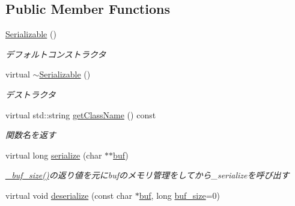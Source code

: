 \subsection*{Public Member Functions}
\begin{DoxyCompactItemize}
\item 
\hypertarget{classskl_1_1_serializable_a94b5cf22d52d2bb6a0fb58e417fa504e}{}\label{classskl_1_1_serializable_a94b5cf22d52d2bb6a0fb58e417fa504e} 
\hyperlink{classskl_1_1_serializable_a94b5cf22d52d2bb6a0fb58e417fa504e}{Serializable} ()
\begin{DoxyCompactList}\small\item\em デフォルトコンストラクタ \end{DoxyCompactList}\item 
\hypertarget{classskl_1_1_serializable_afe0b4a8ee83b34ae2e2b9cd126c662a4}{}\label{classskl_1_1_serializable_afe0b4a8ee83b34ae2e2b9cd126c662a4} 
virtual \hyperlink{classskl_1_1_serializable_afe0b4a8ee83b34ae2e2b9cd126c662a4}{$\sim$\+Serializable} ()
\begin{DoxyCompactList}\small\item\em デストラクタ \end{DoxyCompactList}\item 
\hypertarget{classskl_1_1_serializable_abcf129d50dc5b2f51300645a07ea3a38}{}\label{classskl_1_1_serializable_abcf129d50dc5b2f51300645a07ea3a38} 
virtual std\+::string \hyperlink{classskl_1_1_serializable_abcf129d50dc5b2f51300645a07ea3a38}{get\+Class\+Name} () const
\begin{DoxyCompactList}\small\item\em 関数名を返す \end{DoxyCompactList}\item 
virtual long \hyperlink{classskl_1_1_serializable_a4bd0c82fdb8a663215b54671df1222f2}{serialize} (char $\ast$$\ast$\hyperlink{classskl_1_1_serializable_a1d203d9f0049ce37183a0dcefbc6399a}{buf})
\begin{DoxyCompactList}\small\item\em \hyperlink{classskl_1_1_serializable_a489e26e25bacf78d0dae50f0286c62b5}{\+\_\+buf\+\_\+size()}の返り値を元にbufのメモリ管理をしてから\+\_\+serializeを呼び出す \end{DoxyCompactList}\item 
virtual void \hyperlink{classskl_1_1_serializable_a09f2101bdae407e65e83a286f76cd65f}{deserialize} (const char $\ast$\hyperlink{classskl_1_1_serializable_a1d203d9f0049ce37183a0dcefbc6399a}{buf}, long \hyperlink{classskl_1_1_serializable_a087eb19fada917a42b8411bfecbac0f1}{buf\+\_\+size}=0)
$$
\end{DoxyCompactItemize}

